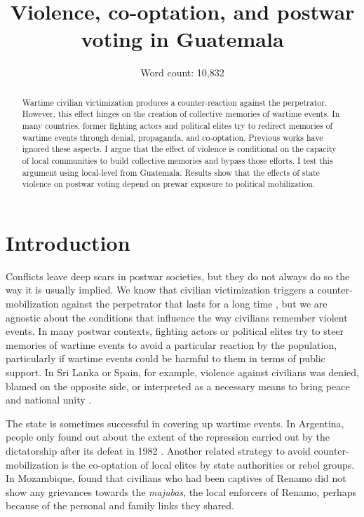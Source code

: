 \documentclass[12pt, notitlepage]{article}
\title{\Large Violence, co-optation, and postwar voting in Guatemala}
\author{}%
\date{Word count: 10,832}
\begin{document}
\maketitle
\thispagestyle{empty}

\vspace{30pt}

\begin{abstract}

Wartime civilian victimization produces a counter-reaction against the perpetrator. However, this effect hinges on the creation of collective memories of wartime events. In many countries, former fighting actors and political elites try to redirect memories of wartime events through denial, propaganda, and co-optation. Previous works have ignored these aspects. I argue that the effect of violence is conditional on the capacity of local communities to build collective memories and bypass those efforts. I test this argument using local-level from Guatemala. Results show that the effects of state violence on postwar voting depend on prewar exposure to political mobilization.

\end{abstract}

\newpage
\setcounter{page}{1}

\section*{Introduction}

Conflicts leave deep scars in postwar societies, but they do not always do so the way it is usually implied.
We know that civilian victimization triggers a counter-mobilization against the perpetrator that lasts for a long time \citep{Balcells:2012aa, Lupu:2017aa, Fontana:2017aa, Rozenas:2017aa, Rozenas:2019aa}, but we are agnostic about the conditions that influence the way civilians remember violent events.
In many postwar contexts, fighting actors or political elites try to steer memories of wartime events to avoid a particular reaction by the population, particularly if wartime events could be harmful to them in terms of public support.
In Sri Lanka or Spain, for example, violence against civilians was denied, blamed on the opposite side, or interpreted as a necessary means to bring peace and national unity \citep{Seoighe:2017aa, Palomares:2004aa}.

The state is sometimes successful in covering up wartime events.
In Argentina, people only found out about the extent of the repression carried out by the dictatorship after its defeat in 1982 \citep{Robben:1995aa}.
Another related strategy to avoid counter-mobilization is the co-optation of local elites by state authorities or rebel groups.
In Mozambique, \citet{Finnegan:1992aa} found that civilians who had been captives of Renamo did not show any grievances towards the \textit{majubas}, the local enforcers of Renamo, perhaps because of the personal and family links they shared.
\end{document}
